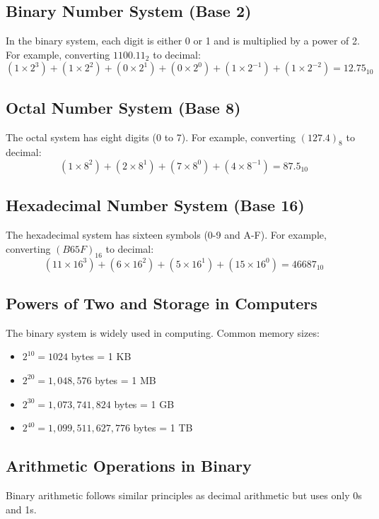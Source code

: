 \documentclass[a4paper,12pt]{article}
\begin{document}
\subsection{Binary Number System (Base 2)}
In the binary system, each digit is either 0 or 1 and is multiplied by a power of 2.
For example, converting $1100.11_2$ to decimal:
\begin{equation}
  (1 \times 2^3) + (1 \times 2^2) + (0 \times 2^1) + (0 \times 2^0) + (1 \times 2^{-1}) + (1 \times 2^{-2}) = 12.75_{10}
\end{equation}

\subsection{Octal Number System (Base 8)}
The octal system has eight digits (0 to 7). For example, converting $(127.4)_8$ to decimal:
\begin{equation}
  (1 \times 8^2) + (2 \times 8^1) + (7 \times 8^0) + (4 \times 8^{-1}) = 87.5_{10}
\end{equation}

\subsection{Hexadecimal Number System (Base 16)}
The hexadecimal system has sixteen symbols (0-9 and A-F). For example, converting $(B65F)_{16}$ to decimal:
\begin{equation}
  (11 \times 16^3) + (6 \times 16^2) + (5 \times 16^1) + (15 \times 16^0) = 46687_{10}
\end{equation}

\subsection{Powers of Two and Storage in Computers}
The binary system is widely used in computing. Common memory sizes:
\begin{itemize}
    \item $2^{10} = 1024$ bytes = 1 KB
    \item $2^{20} = 1,048,576$ bytes = 1 MB
    \item $2^{30} = 1,073,741,824$ bytes = 1 GB
    \item $2^{40} = 1,099,511,627,776$ bytes = 1 TB
\end{itemize}

\subsection{Arithmetic Operations in Binary}
Binary arithmetic follows similar principles as decimal arithmetic but uses only 0s and 1s.
\end{document}
